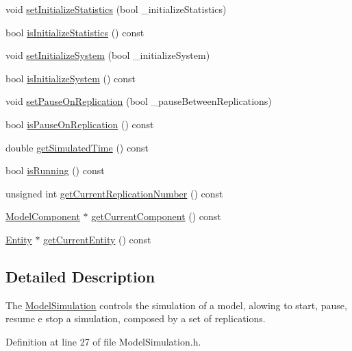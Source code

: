\begin{DoxyCompactItemize}
\item 
void \hyperlink{class_model_simulation_a990e022cf5d9a07a1467282e7999dafb}{set\-Initialize\-Statistics} (bool \-\_\-initialize\-Statistics)
\item 
bool \hyperlink{class_model_simulation_aa4d1e58ddc7f34a6c414b72581424fea}{is\-Initialize\-Statistics} () const 
\item 
void \hyperlink{class_model_simulation_a6aff149fae4ec9be0d98772e263e9508}{set\-Initialize\-System} (bool \-\_\-initialize\-System)
\item 
bool \hyperlink{class_model_simulation_a7ad0ce011b011a12cab4e08ca9a4bb28}{is\-Initialize\-System} () const 
\item 
void \hyperlink{class_model_simulation_ad41d1cfb0e7d4fcafb8bdbdb7f4de516}{set\-Pause\-On\-Replication} (bool \-\_\-pause\-Between\-Replications)
\item 
bool \hyperlink{class_model_simulation_a96696912f5c1098843f2fe991c69136e}{is\-Pause\-On\-Replication} () const 
\item 
double \hyperlink{class_model_simulation_abd147072d362838f89d0b37e7bf16024}{get\-Simulated\-Time} () const 
\item 
bool \hyperlink{class_model_simulation_a1cf94d6c99daef9c8de567fb29c3d7fb}{is\-Running} () const 
\item 
unsigned int \hyperlink{class_model_simulation_ac0ebd4f2076307f171489baf5557e9c2}{get\-Current\-Replication\-Number} () const 
\item 
\hyperlink{class_model_component}{Model\-Component} $\ast$ \hyperlink{class_model_simulation_a84c5dc03c1869181f6cfff2f3ce7fce2}{get\-Current\-Component} () const 
\item 
\hyperlink{class_entity}{Entity} $\ast$ \hyperlink{class_model_simulation_a1b6f4ef7c6eccef2fc4ce4db2889a7c4}{get\-Current\-Entity} () const 
\end{DoxyCompactItemize}


\subsection{Detailed Description}
The \hyperlink{class_model_simulation}{Model\-Simulation} controls the simulation of a model, alowing to start, pause, resume e stop a simulation, composed by a set of replications. 

Definition at line 27 of file Model\-Simulation.\-h.




